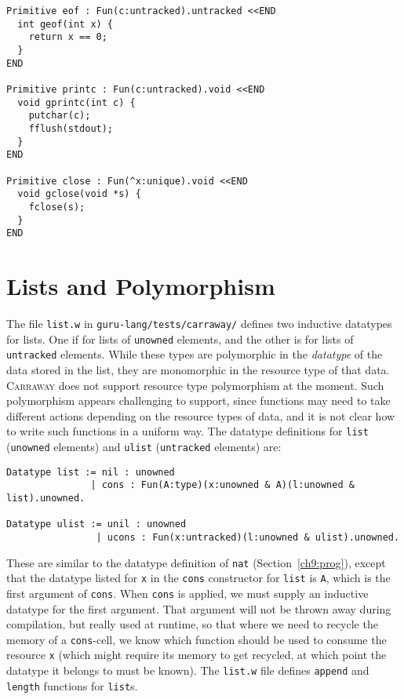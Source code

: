 \documentclass{book}[12pt]
\newcommand{\carraway}[0]{\textsc{Carraway}\xspace}
\begin{document}
\begin{verbatim}
Primitive eof : Fun(c:untracked).untracked <<END
  int geof(int x) {
    return x == 0;
  }
END

Primitive printc : Fun(c:untracked).void <<END
  void gprintc(int c) {
    putchar(c);
    fflush(stdout);
  }
END

Primitive close : Fun(^x:unique).void <<END
  void gclose(void *s) {
    fclose(s);
  }
END
\end{verbatim}

\section{Lists and Polymorphism}

The file \texttt{list.w} in \texttt{guru-lang/tests/carraway/} defines
two inductive datatypes for lists.  One if for lists of
\texttt{unowned} elements, and the other is for lists of
\texttt{untracked} elements.  While these types are polymorphic in the
\emph{datatype} of the data stored in the list, they are monomorphic
in the resource type of that data.  \carraway does not support
resource type polymorphism at the moment.  Such polymorphism appears
challenging to support, since functions may need to take different
actions depending on the resource types of data, and it is not clear
how to write such functions in a uniform way.  The datatype
definitions for \texttt{list} (\texttt{unowned} elements) and
\texttt{ulist} (\texttt{untracked} elements) are:

\begin{verbatim}
Datatype list := nil : unowned 
               | cons : Fun(A:type)(x:unowned & A)(l:unowned & list).unowned.

Datatype ulist := unil : unowned
                | ucons : Fun(x:untracked)(l:unowned & ulist).unowned.
\end{verbatim}

\noindent These are similar to the datatype definition of \texttt{nat}
(Section~\ref{ch9:prog}), except that the datatype listed for
\texttt{x} in the \texttt{cons} constructor for \texttt{list} is
\texttt{A}, which is the first argument of \texttt{cons}.  When
\texttt{cons} is applied, we must supply an inductive datatype for the
first argument.  That argument will not be thrown away during
compilation, but really used at runtime, so that where we need to
recycle the memory of a \texttt{cons}-cell, we know which function
should be used to consume the resource \texttt{x} (which might require
its memory to get recycled, at which point the datatype it belongs to
must be known).  The \texttt{list.w} file defines \texttt{append} and
\texttt{length} functions for \texttt{list}s.
\end{document}

